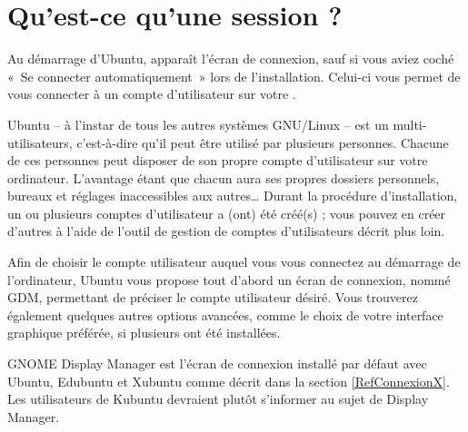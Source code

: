\section{Qu'est-ce qu'une session ?}
\label{PremiereConnexion}
Au démarrage d'Ubuntu, apparaît l'écran de connexion, sauf si vous aviez coché «~Se connecter automatiquement~» lors de l'installation. Celui-ci vous permet de vous connecter à un compte d'utilisateur sur votre .\par
{}
Ubuntu -- à l'instar de tous les autres systèmes GNU/Linux -- est un  multi-utilisateurs, c'est-à-dire qu'il peut être utilisé par plusieurs personnes. Chacune de ces personnes peut disposer de son propre compte d'utilisateur sur votre ordinateur. L'avantage étant que chacun aura ses propres dossiers personnels, bureaux et réglages inaccessibles aux autres\ldots{} Durant la procédure d'installation, un ou plusieurs comptes d'utilisateur a (ont) été créé(s) ; vous pouvez en créer d'autres à l'aide de l'outil de gestion de comptes d'utilisateurs décrit plus loin.\par 
Afin de choisir le compte utilisateur auquel vous vous connectez au démarrage de l'ordinateur, Ubuntu vous propose tout d'abord un écran de connexion, nommé GDM, permettant de préciser le compte utilisateur désiré. Vous trouverez également quelques autres options avancées, comme le choix de votre interface graphique préférée, si plusieurs ont été installées.\par
\begin{nota}
GNOME Display Manager est l'écran de connexion installé par défaut avec Ubuntu, Edubuntu et Xubuntu comme décrit dans la section \ref{RefConnexionX}. Les utilisateurs de Kubuntu devraient plutôt s'informer au sujet de  Display Manager.
\end{nota}
